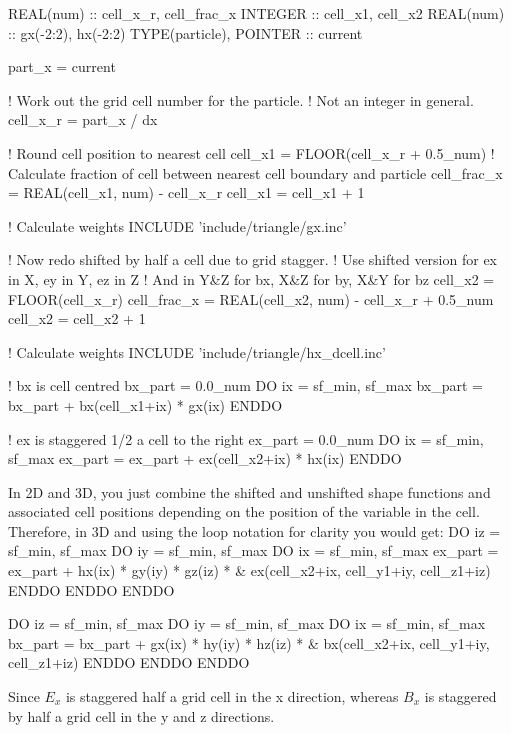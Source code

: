 \documentclass[12pt,a4paper]{article}
\newenvironment{boxverbatim}{\lboxverbatim{none}}{\endlboxverbatim}
\begin{document}
\begin{boxverbatim}
  REAL(num) :: cell_x_r, cell_frac_x
  INTEGER :: cell_x1, cell_x2
  REAL(num) :: gx(-2:2), hx(-2:2)
  TYPE(particle), POINTER :: current

  part_x  = current%

  ! Work out the grid cell number for the particle.
  ! Not an integer in general.
  cell_x_r = part_x / dx

  ! Round cell position to nearest cell
  cell_x1 = FLOOR(cell_x_r + 0.5_num)
  ! Calculate fraction of cell between nearest cell boundary and particle
  cell_frac_x = REAL(cell_x1, num) - cell_x_r
  cell_x1 = cell_x1 + 1

  ! Calculate weights
  INCLUDE 'include/triangle/gx.inc'

  ! Now redo shifted by half a cell due to grid stagger.
  ! Use shifted version for ex in X, ey in Y, ez in Z
  ! And in Y&Z for bx, X&Z for by, X&Y for bz
  cell_x2 = FLOOR(cell_x_r)
  cell_frac_x = REAL(cell_x2, num) - cell_x_r + 0.5_num
  cell_x2 = cell_x2 + 1

  ! Calculate weights
  INCLUDE 'include/triangle/hx_dcell.inc'

  ! bx is cell centred
  bx_part = 0.0_num
  DO ix = sf_min, sf_max
    bx_part = bx_part + bx(cell_x1+ix) * gx(ix)
  ENDDO

  ! ex is staggered 1/2 a cell to the right
  ex_part = 0.0_num
  DO ix = sf_min, sf_max
    ex_part = ex_part + ex(cell_x2+ix) * hx(ix)
  ENDDO
\end{boxverbatim}

In 2D and 3D, you just combine the shifted and unshifted shape functions and
associated cell positions depending on the position of the variable in the
cell. Therefore, in 3D and using the loop notation for clarity you would get:
\begin{boxverbatim}
  DO iz = sf_min, sf_max
    DO iy = sf_min, sf_max
      DO ix = sf_min, sf_max
        ex_part = ex_part + hx(ix) * gy(iy) * gz(iz) * &
            ex(cell_x2+ix, cell_y1+iy, cell_z1+iz)
      ENDDO
    ENDDO
  ENDDO

  DO iz = sf_min, sf_max
    DO iy = sf_min, sf_max
      DO ix = sf_min, sf_max
        bx_part = bx_part + gx(ix) * hy(iy) * hz(iz) * &
            bx(cell_x2+ix, cell_y1+iy, cell_z1+iz)
      ENDDO
    ENDDO
  ENDDO
\end{boxverbatim}

Since $E_x$ is staggered half a grid cell in the x direction, whereas $B_x$ is
staggered by half a grid cell in the y and z directions.
\end{document}

